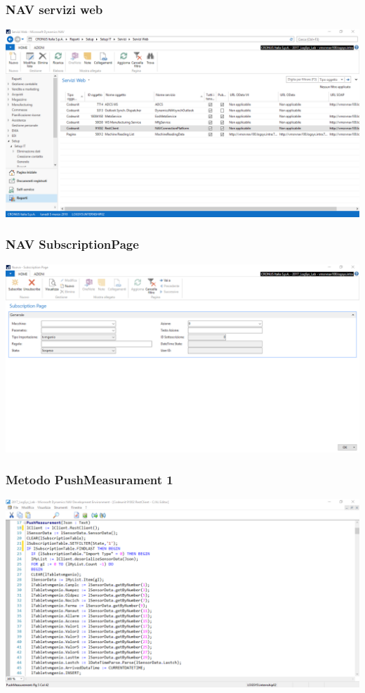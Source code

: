 \documentclass{beamer}
\begin{document}
\begin{frame}
\frametitle{NAV servizi web}
\includegraphics[width=1\textwidth]{images/NAVServiziWeb.png}
\end{frame}


\begin{frame}
\frametitle{NAV SubscriptionPage}
\includegraphics[width=1\textwidth]{images/NAVSubscriptionPage.png}
\end{frame}

\begin{frame}
\frametitle{Metodo PushMeasurament 1}
\includegraphics[width=1\textwidth]{images/NAVPushMeasuraments1.png}
\end{frame}
\end{document}
